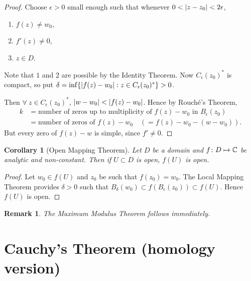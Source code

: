 \documentclass{notes}
\theoremstyle{plain}
\newtheorem{corollary}[proposition]{Corollary}
\newtheorem*{remark}{Remark}
\begin{document}
\begin{proof}
Choose $\epsilon > 0$ small enough such that whenever
$0 < \left|z - z_0\right| < 2 \epsilon$,
\begin{enumerate}
\item $f(z) \neq w_0$,
\item $f'(z) \neq 0$,
\item $z \in D$.
\end{enumerate}

Note that $1$ and $2$ are possible by the Identity Theorem.  Now
$C_\epsilon(z_0)^*$ is compact, so put $\delta = \inf \{ 
\left|f(z) - w_0\right| : z \in C_\epsilon(z_0)^*\} > 0$.

Then $\forall\ z \in C_\epsilon(z_0)^*$, $\left|w-w_0\right| < \left|f(z) - w_0\right|$.
Hence by Rouch\'{e}'s Theorem,
\begin{align*}
k &= \text{number of zeros up to multiplicity of } f(z) - w_0 \text{ in } 
B_\epsilon(z_0) \\
&= \text{number of zeros of } f(z) - w_0 \quad (= f(z) - w_0 - (w-w_0) ).
\end{align*}
But every zero of $f(z) - w$ is simple, since $f' \neq 0$.
\end{proof}

\begin{corollary}[Open Mapping Theorem]
Let $D$ be a domain and $f \colon D \mapsto \mathbb{C}$ be analytic and non-constant.  Then
if $U \subset D$ is open, $f(U)$ is open.
\end{corollary}

\begin{proof}
Let $w_0 \in f(U)$ and $z_0$ be such that $f(z_0) = w_0$.  The Local Mapping
Theorem provides $\delta > 0$ such that $B_\delta(w_0) \subset 
f(B_\epsilon(z_0)) \subset f(U)$.  Hence $f(U)$ is open.
\end{proof}

\begin{remark}
The Maximum Modulus Theorem follows immediately.
\end{remark}

\clearpage

\chapter{Cauchy's Theorem (homology version)}
\end{document}
